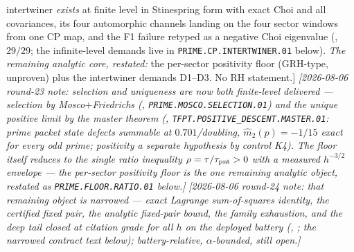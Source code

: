 {{intertwiner \emph{exists} at finite level in Stinespring form with
exact Choi and all covariances, its four automorphic channels
landing on the four sector windows from one CP map, and the F1
failure retyped as a negative Choi eigenvalue
(, $29/29$; the
infinite-level demands live in
\texttt{PRIME.CP.INTERTWINER.01} below).  \emph{The remaining
analytic core, restated:} the per-sector positivity floor
(GRH-type, unproven) plus the intertwiner demands D1--D3.  No RH
statement.]}
\emph{[2026-08-06 round-23 note: selection and uniqueness are now
both finite-level delivered --- selection by Mosco$+$Friedrichs
(,
\texttt{PRIME.MOSCO.SELECTION.01}) and the unique positive limit
by the master theorem
(,
\texttt{TFPT.POSITIVE\_DESCENT.MASTER.01}: prime packet state
defects summable at $0.701$/doubling, $\hat m_2(p)=-1/15$ exact
for every odd prime; positivity a \emph{separate} hypothesis by
control K4).  The floor itself reduces to the single ratio
inequality $\rho=\tau/\tau_{\rm pnt}>0$ with a measured
$h^{-3/2}$ envelope --- the per-sector positivity floor is the
\emph{one} remaining analytic object, restated as
\texttt{PRIME.FLOOR.RATIO.01} below.]}
\emph{[2026-08-06 round-24 note: that remaining object is
\emph{narrowed} --- exact Lagrange sum-of-squares identity, the
certified fixed pair, the analytic fixed-pair bound, the family
exhaustion, and the deep tail closed at citation grade for all
$h$ on the deployed battery
(,
; the narrowed contract
text below); battery-relative, $\alpha$-bounded, still open.]}\par}


